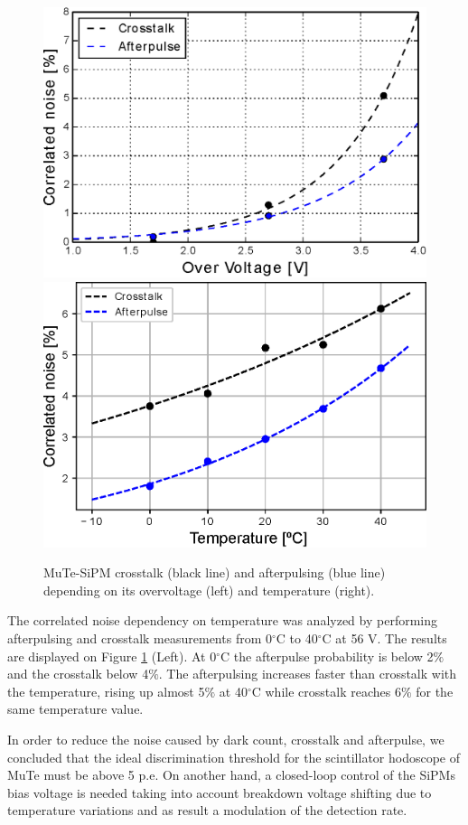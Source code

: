 \documentclass[a4paper,11pt]{article}
\begin{document}
\begin{figure}[htbp]
\centering 
\includegraphics[width=.48\textwidth]{Figures/CorrNoise_vs_Ov_1350CS.eps}
\quad
\includegraphics[width=.48\textwidth]{Figures/CorrNoise_vs_T_1350CS.eps}
\caption{MuTe-SiPM crosstalk (black line) and afterpulsing (blue line) depending on its overvoltage (left) and temperature (right).}
\label{fig:after_cross}
\end{figure}

The correlated noise dependency on temperature was analyzed by performing afterpulsing and crosstalk measurements from 0$^{\circ}$C to 40$^{\circ}$C at 56 V. The results are displayed on Figure \ref{fig:after_cross} (Left). At 0$^{\circ}$C the afterpulse probability is below 2$\%$ and the crosstalk below 4$\%$. The afterpulsing increases faster than crosstalk with the temperature, rising up almost 5$\%$ at 40$^{\circ}$C while crosstalk reaches 6$\%$ for the same temperature value.

In order to reduce the noise caused by dark count, crosstalk and afterpulse, we concluded that the ideal discrimination threshold for the scintillator hodoscope of MuTe must be above 5 p.e. On another hand, a closed-loop control of the SiPMs bias voltage is needed taking into account breakdown voltage shifting due to temperature variations and as result a modulation of the detection rate.

\end{document}
